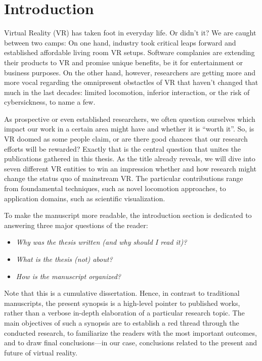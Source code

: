 %
\chapter{Introduction}
\label{sec:intro}



Virtual Reality (VR) has taken foot in everyday life. Or didn't it? We are caught between two camps: On one hand, industry took critical leaps forward and established affordable living room VR setups. Software complanies are extending their products to VR and promise unique benefits, be it for entertainment or business purposes. On the other hand, however, researchers are getting more and more vocal  regarding the omnipresent obstactles of VR that haven't changed that much in the last decades: limited locomotion, inferior interaction, or the risk of cybersickness, to name a few.




As prospective or even established researchers, we often question ourselves which impact our work in a certain area might have and whether it is ``worth it''. So, is VR doomed as some people claim, or are there good chances that our research efforts will be rewarded? Exactly that is the central question that unites the publications gathered in this thesis. As the title already reveals, we will dive into seven different VR entities to win an impression whether and how research might change the status quo of mainstream VR. The particular contributions range from foundamental techniques, such as novel locomotion approaches, to application domains, such as scientific visualization. 

To make the manuscript more readable, the introduction section is dedicated to answering three major questions of the reader: 
\begin{itemize}[noitemsep]
\item \textit{Why was the thesis written (and why should I read it)?}
\item \textit{What is the thesis (not) about?}
\item \textit{How is the manuscript organized?}
\end{itemize}
Note that this is a cumulative dissertation. Hence, in contrast to traditional manuscripts, the present synopsis is a high-level pointer to published works, rather than a verbose in-depth elaboration of a particular research topic. The main objectives of such a synopsis are to establish a red thread through the conducted research, to familiarize the readers with the most important outcomes, and to draw final conclusions---in our case, conclusions related to the present and future of virtual reality.






